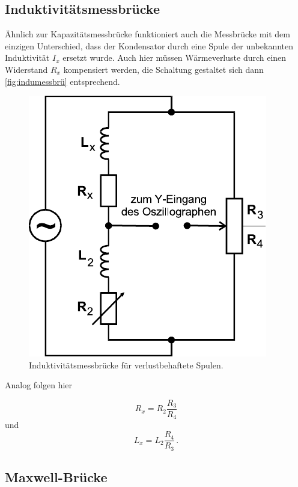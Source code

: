 \subsection{Induktivitätsmessbrücke}
\label{subsec:indumessbrü}

Ähnlich zur Kapazitätsmessbrücke funktioniert auch die Messbrücke mit dem einzigen Unterschied, dass der Kondensator durch eine Spule der unbekannten Induktivität $I_x$ ersetzt wurde.
Auch hier müssen Wärmeverluste durch einen Widerstand $R_x$ kompensiert werden, die Schaltung gestaltet sich dann \autoref{fig:indumessbrü} entsprechend.

\begin{figure}[H]
    \centering
    \includegraphics{figures/Induktivitätsmessbrücke.pdf}
    \caption{Induktivitätsmessbrücke für verlustbehaftete Spulen\cite{ap07}.}
    \label{fig:indumessbrü}
\end{figure}

Analog folgen hier

\begin{equation}
    R_x = R_2 \frac{R_3}{R_4}
    \label{eq:resxindubrü}
\end{equation}
und
\begin{equation}
    L_x = L_2 \frac{R_4}{R_3}\,.
    \label{eq:induxindubrü}
\end{equation}


\subsection{Maxwell-Brücke}
\label{subsec:maxwellbrü}

